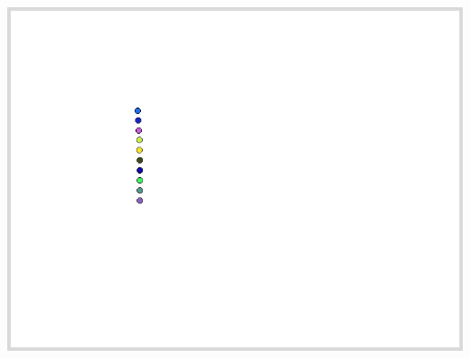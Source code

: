 \documentclass[11pt,class=report,crop=false]{standalone}
\begin{document}
\begin{activite}
\begin{center}
\includegraphics[scale=\myscale,scale=0.18]{ecran-mouvement-020}

\smallskip


\end{center}
\end{activite}
\end{document}
